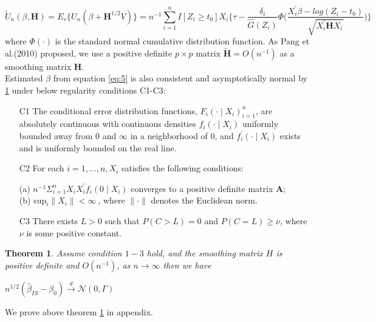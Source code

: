 \documentclass[12pt]{article}
\newtheorem{theorem}{Theorem}
\begin{document}
	\begin{equation} \label{eq:5}
	\tilde{U}_n(\beta, \textbf{H}) = E_v \{U_n(\beta+\textbf{H}^{1/2}V)\} = n^{-1} \sum_{i=1}^{n} I[Z_i \geq t_0] X_i \Big\{\tau - \frac{\delta_i}{\hat{G}(Z_i)}\Phi\Big(\frac{X_i^\prime\beta-log(Z_i-t_0)}{\sqrt{X_i^{\prime} \textbf{H} X_{i}}}\Big)\Big\}
	\end{equation} 
	where $\Phi(\cdot)$ is the standard normal cumulative distribution function. As Pang et al.(2010) proposed, we use a positive definite $p \times p$ matrix $\tilde{\textbf{H}} = O(n^{-1})$ as a smoothing matrix $\textbf{H}$.\\ Estimated $\beta$ from equation \ref{eq:5} is also consistent and asymptotically normal by \ref{thm:1} under below regularity conditions C1-C3:
	\begin{enumerate}
		\item[C1] The conditional error distribution functions, $F_{i}(\cdot\mid X_{i})^{n}_{i=1}$, are absolutely continuous with continuous densities $f_{i}(\cdot\mid X_{i})$ uniformly bounded away from $0$ and $\infty$ in a neighborhood of $0$, and $f_{i}^{\prime}(\cdot\mid X_{i})$ exists and is uniformly bounded on the real line.
		\item[C2] For each $i=1,\dots, n, X_{i}$ satisfies the following conditions:
		\begin{flushleft}
			(a) $n^{-1}\Sigma_{i=1}^{n} X_{i} X_{i}^{\prime}f_{i}(0\mid X_{i})$ converges to a positive definite matrix \textbf{A};\\
			(b) sup$_{i}\lVert X_{i} \rVert < \infty\ $, where $\lVert \cdot \rVert$ denotes the Euclidean norm.\\
		\end{flushleft}
		\item[C3] There exists $L>0$ such that $P(C>L)=0$ and $P(C=L)\geq\nu$, where $\nu$ is some positive constant.
	\end{enumerate} 

	\begin{theorem} \label{thm:1}
	Assume condition $1-3$ hold, and the smoothing matrix $H$ is positive definite and $O(n^{-1})$, as $n\to\infty$ then we have
		\begin{center}
			$n^{1/2}(\hat{\beta}_{IS}-\beta_0) \xrightarrow{d} \mathcal{N}(0,\Gamma)$
		\end{center}
	\end{theorem}
	
	\noindent We prove above theorem \ref{thm:1} in appendix.\\
	
\end{document}
